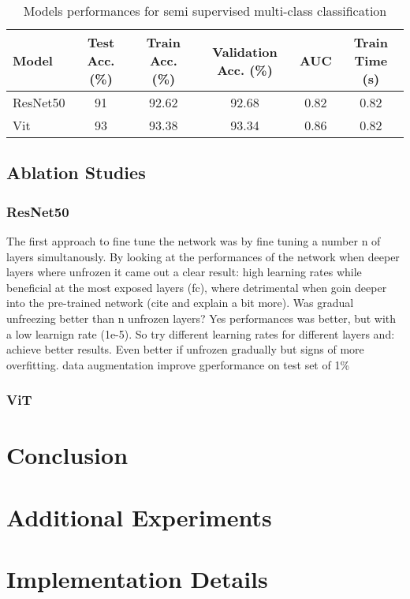 \documentclass{article}
\begin{document}
\renewcommand{\arraystretch}{1.2} 
\begin{table}[h!] %
    \centering %
    \caption{Models performances for semi supervised multi-class classification} %
    \label{tab:semi_multi_perf} %
    \begin{tabular}{|l|c|c|c|c|c|}
        \hline
        Model & Test Acc. (\%) & Train Acc. (\%) & Validation Acc. (\%) & AUC & Train Time (s) \\
        \hline
        ResNet50 & 91 & 92.62 & 92.68 & 0.82 & 0.82 \\
        Vit & 93 & 93.38 & 93.34 & 0.86 & 0.82 \\
        \hline
    \end{tabular}
\end{table}

\subsection{Ablation Studies}


\subsubsection{ResNet50}
The first approach to fine tune the network was by fine tuning a number n of layers simultanously. By looking at the performances of the network when deeper layers where unfrozen it came out a clear result: high learning rates while beneficial at the most exposed layers (fc), where detrimental when goin deeper into the pre-trained network (cite and explain a bit more). Was gradual unfreezing better than n unfrozen layers? Yes performances was better, but with a low learnign rate (1e-5). So try different learning rates for different layers and: achieve better results. Even better if unfrozen gradually but signs of more overfitting. data augmentation improve gperformance on test set of 1\%

\subsubsection{ViT}

\section{Conclusion}






\appendix
\section{Additional Experiments}


\section{Implementation Details}
\end{document}
